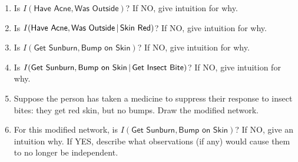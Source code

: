\documentclass[submit]{harvardml}
\newcommand{\attr}[1]{\textsf{#1}}
\begin{document}
\begin{problem}
%
\begin{enumerate}
\item Is $I(\attr{Have Acne},\attr{Was Outside})$? If NO, give
intuition for why.
%
%
\item Is $I(\attr{Have Acne},\attr{Was Outside}\given \attr{Skin Red})$? If NO, give
intuition for why.
%
%
\item Is $I(\attr{Get Sunburn},\attr{Bump on Skin})$? If NO, give
intuition for why.
%
\item Is $I(\attr{Get Sunburn},\attr{Bump on Skin}\given \attr{Get Insect Bite})$? If NO, give intuition for why.
%
\item Suppose the person has taken a medicine to suppress their
  response to insect bites: they get red skin, but no bumps.  Draw the
  modified network.  
%
%
\item For this modified network, is $I(\attr{Get Sunburn},\attr{Bump
  on Skin})$? If NO, give an intuition why.  If YES, describe what
  observations (if any) would cause them to no longer be independent.    
%
\end{enumerate}
\end{problem}

\newpage
\end{document}
